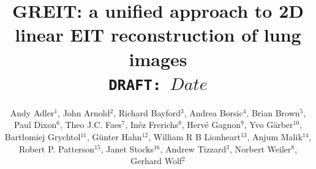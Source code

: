 \documentclass[12pt]{iopart}
\begin{document}
\title[GREIT: linear EIT image reconstruction]{%
GREIT: a unified approach to 2D linear EIT reconstruction of
       lung images
\\
{\small \tt DRAFT: $Date$}
}

\author{Andy Adler$^{1}$,
        John Arnold$^{2}$,
        Richard Bayford$^{3}$,
        Andrea Borsic$^{4}$,
        Brian Brown$^{5}$,
        Paul Dixon$^{6}$,
        Theo J.C. Faes$^{7}$,
        In\'ez Frerichs$^{8}$,
        Herv\'e Gagnon$^{9}$,
        Yvo G\"arber$^{10}$,
        Bart\l{}omiej Grychtol$^{11}$, 
        G\"unter Hahn$^{12}$,
        William R B Lionheart$^{13}$,
        Anjum Malik$^{14}$,
        Robert P. Patterson$^{15}$,
        Janet Stocks$^{16}$,
        Andrew Tizzard$^{3}$,
        Norbert Weiler$^{8}$,
        Gerhard Wolf$^{2}$%
       }

\address{ $^{1}$Systems and Computer Engineering,
                Carleton University, Ottawa, Canada}
\address{ $^{2}$Division of Critical Care Medicine, Department of Anesthesia,
                Children's Hospital Boston, Harvard Medical School,
                Boston, MA, USA}
\address{ $^{3}$School of Health and Social Sciences,
                Middlesex University, London, UK}
\address{ $^{4}$School of Engineering, 
                Dartmouth College, Hanover, NH, USA}
\address{ $^{5}$Medical Physics, University of Sheffield, UK}
\address{ $^{6}$Cardinal Health Care, London, UK}
\address{ $^{7}$Department of Physics and Medical Technology,
                V.U. university medical center, Amsterdam, Netherlands}
\address{ $^{8}$Department of Anaesthesiology and Intensive Care Medicine,
                University of Schleswig-Holstein, Kiel, Germany}
\address{ $^{9}$D\'epartement de g\'enie \'electrique,
                \'Ecole Polytechnique de Montr\'eal, Canada}
\address{$^{10}$Dr\"ager Medical, L\"ubeck, Germany}
\address{$^{11}$University of Strathclyde, Glasgow, UK}
\address{$^{12}$Department of Anaesthesiological Research,
                University of G\"ottingen, Germany}
\address{$^{13}$School of Mathematics, University of Manchester, UK}
\address{$^{14}$Maltron International, Rayleigh, UK}
\address{$^{15}$Department of Biomedical Engineering,
                University of Minnesota, Minneapolis, MN, USA}
\address{$^{16}$Institute of Child Health,
                University College London, UK}
\end{document}
